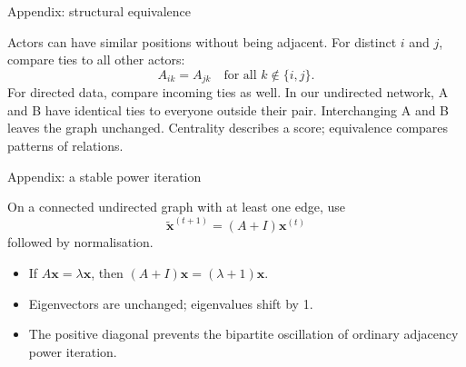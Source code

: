 \documentclass[aspectratio=169,11pt]{beamer}
\begin{document}
\begin{frame}{Appendix: structural equivalence}

Actors can have similar positions without being adjacent.
For distinct $i$ and $j$, compare ties to all other actors:
\[A_{ik}=A_{jk}\quad\text{for all }k\notin\{i,j\}.\]
For directed data, compare incoming ties as well.
\medskip
In our undirected network, A and B have identical ties to everyone outside their pair. Interchanging A and B leaves the graph unchanged.
\medskip
\textcolor{accent}{Centrality describes a score; equivalence compares patterns of relations.}


\end{frame}

\begin{frame}{Appendix: a stable power iteration}

On a connected undirected graph with at least one edge, use
\[\widetilde{\mathbf{x}}^{(t+1)}=(A+I)\mathbf{x}^{(t)}\]
followed by normalisation.
\begin{itemize}
\item If $A\mathbf{x}=\lambda\mathbf{x}$, then $(A+I)\mathbf{x}=(\lambda+1)\mathbf{x}$.
\medskip\item Eigenvectors are unchanged; eigenvalues shift by 1.
\medskip\item The positive diagonal prevents the bipartite oscillation of ordinary adjacency power iteration.
\end{itemize}


\end{frame}
\end{document}
